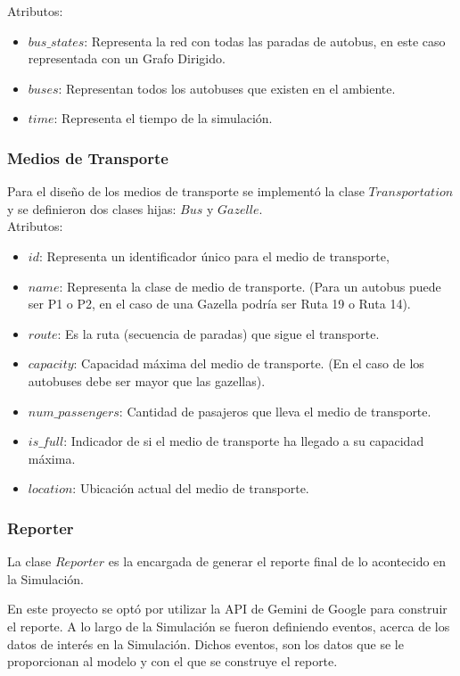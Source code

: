 \documentclass{article}
\begin{document}
Atributos:

\begin{itemize}
    \item $bus\_states$: Representa la red con todas las paradas de autobus, en este caso representada con un Grafo Dirigido.
    \item $buses$: Representan todos los autobuses que existen en el ambiente.
    \item $time$: Representa el tiempo de la simulación.
\end{itemize}

\subsubsection{Medios de Transporte}
Para el diseño de los medios de transporte se implementó la clase $Transportation$ y se definieron dos clases hijas: $Bus$ y $Gazelle$.
\\

Atributos:
\begin{itemize}
    \item $id$: Representa un identificador único para el medio de transporte,
    \item $name$: Representa la clase de medio de transporte. (Para un autobus puede ser P1 o P2, en el caso de una Gazella podría ser Ruta 19 o Ruta 14).
    \item $route$: Es la ruta (secuencia de paradas) que sigue el transporte.
    \item $capacity$: Capacidad máxima del medio de transporte. (En el caso de los autobuses debe ser mayor que las gazellas).
    \item $num\_passengers$: Cantidad de pasajeros que lleva el medio de transporte. 
    \item $is\_full$: Indicador de si el medio de transporte ha llegado a su capacidad máxima.
    \item $location$: Ubicación actual del medio de transporte.
\end{itemize}

\subsubsection{Reporter}
La clase $Reporter$ es la encargada de generar el reporte final de lo acontecido en la Simulación. 

En este proyecto se optó por utilizar la API de Gemini de Google para construir el reporte. A lo largo de la Simulación se fueron definiendo eventos, acerca de los datos de interés en la Simulación. Dichos eventos, son los datos que se le proporcionan al modelo y con el que se construye el reporte. 
\end{document}
